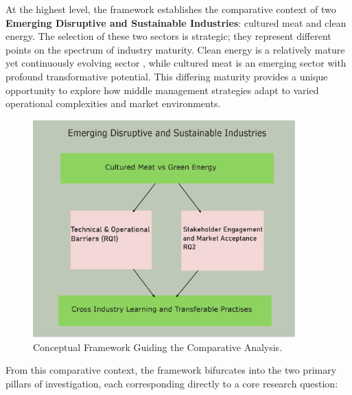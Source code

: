 At the highest level, the framework establishes the comparative context of two \textbf{Emerging Disruptive and Sustainable Industries}: cultured meat and clean energy. The selection of these two sectors is strategic; they represent different points on the spectrum of industry maturity. Clean energy is a relatively mature yet continuously evolving sector , while cultured meat is an emerging sector with profound transformative potential. This differing maturity provides a unique opportunity to explore how middle management strategies adapt to varied operational complexities and market environments.

\begin{figure}[h!]
	\centering
	\includegraphics[width=0.9\textwidth]{images/conceptual_Model.eps}
	\caption{Conceptual Framework Guiding the Comparative Analysis.}
	\label{fig:framework}
\end{figure}

From this comparative context, the framework bifurcates into the two primary pillars of investigation, each corresponding directly to a core research question:

